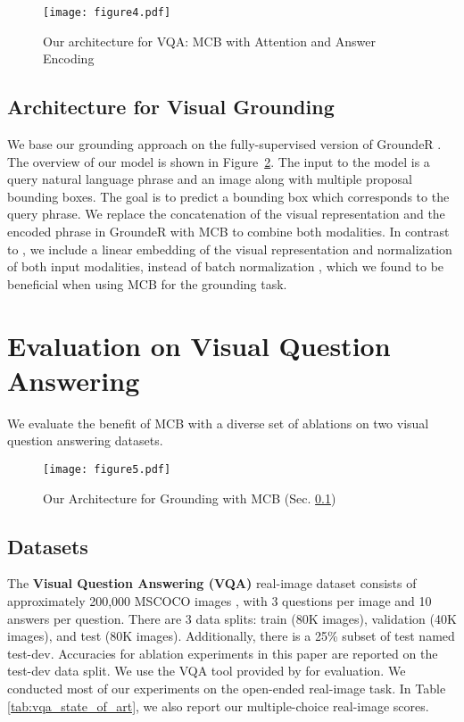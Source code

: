 \documentclass[11pt,letterpaper]{article}
\DeclareRobustCommand{\Figref}[1]{Figure~\ref{#1}}
\begin{document}
\begin{figure}[t]
\texttt{[image: figure4.pdf]}
\vspace{-0.5cm}
\caption{Our architecture for VQA: MCB with Attention and Answer Encoding}
\label{fig:model_7w}
\end{figure}

\subsection{Architecture for Visual Grounding}
\label{sec:architecture:grounding}
We base our grounding approach on the fully-supervised version of GroundeR \cite{rohrbach16arxiv}. The overview of our model is shown in  \Figref{fig:model_grounder}. The input to the model is a query natural language phrase and an image along with multiple proposal bounding boxes. The goal is to predict a bounding box which corresponds to the query phrase. We replace the concatenation of the visual representation and the encoded phrase in GroundeR with MCB to combine both modalities. In contrast to ,  we include a linear embedding of the visual representation and  normalization of both input modalities, instead of batch normalization \cite{ioffe2015batch}, which we found to be beneficial when using MCB for the grounding task. 

 
\section{Evaluation on Visual Question Answering}
We evaluate the benefit of MCB  with a diverse set of ablations on two visual question answering datasets. 


\begin{figure}[t]
\texttt{[image: figure5.pdf]}
\vspace{-0.4cm}
\caption{Our Architecture for Grounding with MCB (Sec. \ref{sec:architecture:grounding})}
\label{fig:model_grounder}
\end{figure}


\subsection{Datasets}
The \textbf{Visual Question Answering (VQA)} real-image dataset \cite{antol2015vqa} consists of approximately 200,000 MSCOCO images \cite{lin2014microsoft}, with 3 questions per image and 10 answers per question. There are 3 data splits: train (80K images), validation (40K images), and test (80K images). Additionally, there is a 25\% subset of test named test-dev. Accuracies for ablation experiments in this paper are reported on the test-dev data split. We use the VQA tool provided by  for evaluation. We conducted most of our experiments on the open-ended real-image task. In Table \ref{tab:vqa_state_of_art}, we also report our multiple-choice real-image scores.
\end{document}
